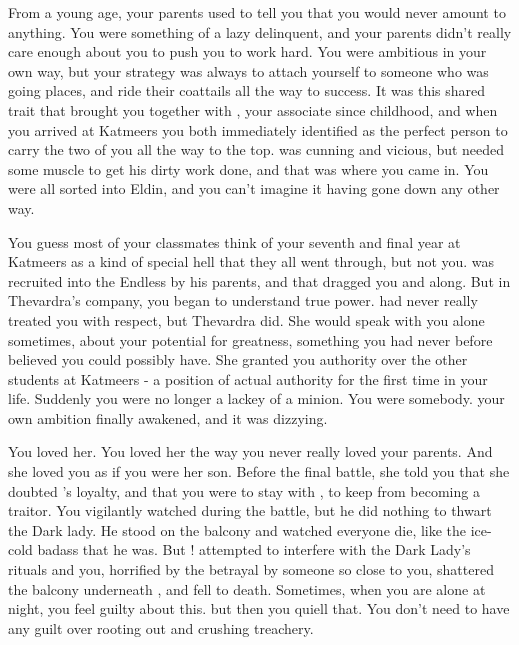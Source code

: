 \documentclass[char]{Katmeers}
\begin{document}
\name{\cGoyle{}}


From a young age, your parents used to tell you that you would never amount to anything. You were something of a lazy delinquent, and your parents didn't really care enough about you to push you to work hard. You were ambitious in your own way, but your strategy was always to attach yourself to someone who was going places, and ride their coattails all the way to success. It was this shared trait that brought you together with \cGhost{\formal}, your associate since childhood, and when you arrived at Katmeers you both immediately identified \cMalfoy{} as the perfect person to carry the two of you all the way to the top. \cMalfoy{\They} was cunning and vicious, but \cMalfoy{\they} needed some muscle to get his dirty work done, and that was where you came in. You were all sorted into Eldin, and you can't imagine it having gone down any other way.

You guess most of your classmates think of your seventh and final year at Katmeers as a kind of special hell that they all went through, but not you. \cMalfoy{\formal} was recruited into the Endless by his parents, and that dragged you and \cGhost{\formal} along. But in Thevardra's company, you began to understand true power. \cMalfoy{\formal} had never really treated you with respect, but Thevardra did. She would speak with you alone sometimes, about your potential for greatness, something you had never before believed you could possibly have. She granted you authority over the  other students at Katmeers - a position of actual authority for the first time in your life. Suddenly you were no longer a lackey of a minion. You were somebody. your own ambition finally awakened, and it was dizzying.

You loved her. You loved her the way you never really loved your parents. And she loved you as if you were her son. Before the final battle, she told you that she doubted \cMalfoy{}'s loyalty, and that you were to stay with \cMalfoy{\them}, to keep \cMalfoy{\them} from becoming a traitor. You vigilantly watched \cMalfoy{\them} during the battle, but he did nothing to thwart the Dark lady. He stood on the balcony and watched everyone die, like the ice-cold badass that he was. But \cGhost{\formal}! \cGhost{\formal} attempted to interfere with the Dark Lady's rituals and you, horrified by the betrayal by someone so close to you, shattered the balcony underneath \cGhost{\them}, and \cGhost{\they} fell to \cGhost{\their} death. Sometimes, when you are alone at night, you feel guilty about this. but then you quiell that. You don't need to have any guilt over rooting out and crushing treachery.
\end{document}
